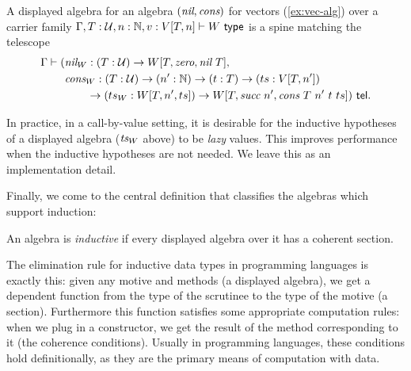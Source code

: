 \begin{example}[Vectors]\label{ex:vec-disp-alg}
A displayed algebra for an algebra $(\textit{nil}, \textit{cons})$ for vectors
(\cref{ex:vec-alg}) over a carrier family $\Gamma, T : \mathcal{U}, n : \mathbb{N}, v
: V[T, n] \vdash W \ \textsf{type}$ is a spine matching
the telescope
\begin{align*}
 \Gamma \vdash (&\n{nil}_W : (T : \univ) \to W[T, \n{zero}, \n{nil}\ T], \\
&\n{cons}_W : (T : \univ) \to (n' : \mathbb{N}) \to (t : T) \to (ts : V[T,n']) \\
&\qquad \to (ts_W : W[T, n', ts]) \to W[T, \n{succ}\ n', \n{cons}\ T\ n'\ t\ ts]) \tel.
\end{align*}
\end{example}

In practice, in a call-by-value setting, it is desirable for the inductive
hypotheses of a displayed algebra ($\textit{ts}_W$ above) to be
\emph{lazy} values. This improves performance when the inductive hypotheses are
not needed. We leave this as an implementation detail.

Finally, we come to the central definition
that classifies the algebras which
support induction:
\begin{definition}
An algebra is \emph{inductive} if every displayed algebra over it has a coherent section.
\end{definition}
The elimination rule for inductive data types in programming languages is
exactly this: given any motive and methods (a displayed algebra), we get a
dependent function from the type of the scrutinee to the type of the motive (a
section). Furthermore this function satisfies some appropriate computation rules:
when we plug in a constructor, we get the result of the method corresponding to it (the coherence conditions).
Usually in programming languages, these conditions hold definitionally, as they are the primary means
of computation with data.




